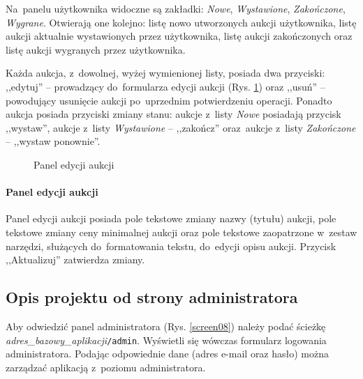 Na~panelu użytkownika widoczne są zakładki: \textit{Nowe}, \textit{Wystawione}, \textit{Zakończone}, \textit{Wygrane}. Otwierają one kolejno: listę nowo utworzonych aukcji użytkownika, listę aukcji aktualnie wystawionych przez użytkownika, listę aukcji zakończonych oraz listę aukcji wygranych przez użytkownika.


Każda aukcja, z~dowolnej, wyżej wymienionej listy, posiada dwa przyciski: ,,edytuj'' -- prowadzący do~formularza edycji aukcji (Rys. \ref{screen06}) oraz ,,usuń'' -- powodujący usunięcie aukcji po~uprzednim potwierdzeniu operacji. Ponadto aukcja posiada przyciski zmiany stanu: aukcje z~listy \textit{Nowe} posiadają przycisk ,,wystaw'', aukcje z~listy \textit{Wystawione} -- ,,zakończ'' oraz~aukcje z~listy \textit{Zakończone} -- ,,wystaw ponownie''.

\begin{figure}[h]
\centering
{}
\caption{Panel edycji aukcji}
\label{screen06}
\end{figure}

\paragraph{Panel edycji aukcji}

Panel edycji aukcji posiada pole tekstowe zmiany nazwy (tytułu) aukcji, pole tekstowe zmiany ceny minimalnej aukcji oraz pole tekstowe zaopatrzone w~zestaw narzędzi, służących do~formatowania tekstu, do~edycji opisu aukcji. Przycisk ,,Aktualizuj'' zatwierdza zmiany.

\subsection{Opis projektu od strony administratora}

Aby odwiedzić panel administratora (Rys. \ref{screen08}) należy podać ścieżkę \textit{adres\_bazowy\_aplikacji}\texttt{/admin}. Wyświetli się wówczas formularz logowania administratora. Podając odpowiednie dane (adres e-mail oraz hasło) można zarządzać aplikacją z~poziomu administratora.

